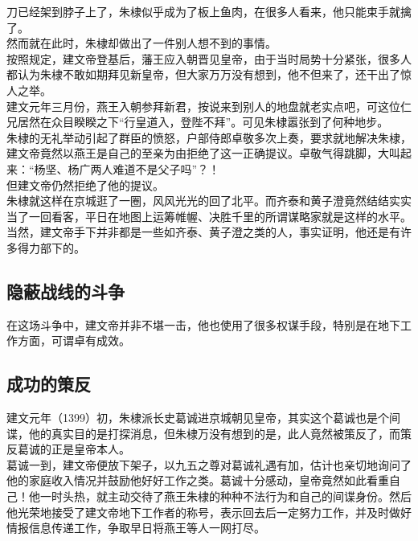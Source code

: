 \begin{multicols}{\theparacolNo}
刀已经架到脖子上了，朱棣似乎成为了板上鱼肉，在很多人看来，他只能束手就擒了。\\

然而就在此时，朱棣却做出了一件别人想不到的事情。\\

按照规定，建文帝登基后，藩王应入朝晋见皇帝，由于当时局势十分紧张，很多人都认为朱棣不敢如期拜见新皇帝，但大家万万没有想到，他不但来了，还干出了惊人之举。\\

建文元年三月份，燕王入朝参拜新君，按说来到别人的地盘就老实点吧，可这位仁兄居然在众目睽睽之下“行皇道入，登陛不拜”。可见朱棣嚣张到了何种地步。\\

朱棣的无礼举动引起了群臣的愤怒，户部侍郎卓敬多次上奏，要求就地解决朱棣，建文帝竟然以燕王是自己的至亲为由拒绝了这一正确提议。卓敬气得跳脚，大叫起来：“杨坚、杨广两人难道不是父子吗”？！\\

但建文帝仍然拒绝了他的提议。\\

朱棣就这样在京城逛了一圈，风风光光的回了北平。而齐泰和黄子澄竟然结结实实当了一回看客，平日在地图上运筹帷幄、决胜千里的所谓谋略家就是这样的水平。\\

当然，建文帝手下并非都是一些如齐泰、黄子澄之类的人，事实证明，他还是有许多得力部下的。\\

\subsection{隐蔽战线的斗争}
在这场斗争中，建文帝并非不堪一击，他也使用了很多权谋手段，特别是在地下工作方面，可谓卓有成效。\\

\subsection{成功的策反}
建文元年（1399）初，朱棣派长史葛诚进京城朝见皇帝，其实这个葛诚也是个间谍，他的真实目的是打探消息，但朱棣万没有想到的是，此人竟然被策反了，而策反葛诚的正是皇帝本人。\\

葛诚一到，建文帝便放下架子，以九五之尊对葛诚礼遇有加，估计也亲切地询问了他的家庭收入情况并鼓励他好好工作之类。葛诚十分感动，皇帝竟然如此看重自己！他一时头热，就主动交待了燕王朱棣的种种不法行为和自己的间谍身份。然后他光荣地接受了建文帝地下工作者的称号，表示回去后一定努力工作，并及时做好情报信息传递工作，争取早日将燕王等人一网打尽。\\


\end{multicols}
